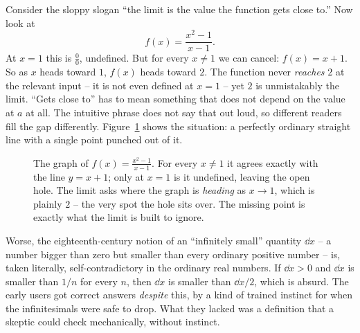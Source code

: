 \begin{intuitionbox}
Consider the sloppy slogan ``the limit is the value the function gets close to.''
Now look at
\[
  f(x) = \frac{x^2 - 1}{x - 1}.
\]
At $x = 1$ this is $\tfrac{0}{0}$, undefined. But for every $x \ne 1$ we can
cancel: $f(x) = x + 1$. So as $x$ heads toward $1$, $f(x)$ heads toward $2$. The
function never \emph{reaches} $2$ at the relevant input -- it is not even
defined at $x=1$ -- yet $2$ is unmistakably the limit. ``Gets close to'' has to
mean something that does not depend on the value at $a$ at all. The intuitive
phrase does not say that out loud, so different readers fill the gap
differently. Figure~\ref{ch06:fig-hole} shows the situation: a perfectly
ordinary straight line with a single point punched out of it.
\end{intuitionbox}

\begin{figure}[H]
\centering
{}
\caption{The graph of $f(x)=\frac{x^2-1}{x-1}$. For every $x\ne1$ it agrees
exactly with the line $y=x+1$; only at $x=1$ is it undefined, leaving the open
hole. The limit asks where the graph is \emph{heading} as $x\to1$, which is
plainly $2$ -- the very spot the hole sits over. The missing point is exactly
what the limit is built to ignore.}
\label{ch06:fig-hole}
\end{figure}

Worse, the eighteenth-century notion of an ``infinitely small'' quantity $\dd x$
-- a number bigger than zero but smaller than every ordinary positive number --
is, taken literally, self-contradictory in the ordinary real numbers. If
$\dd x > 0$ and $\dd x$ is smaller than $1/n$ for every $n$, then $\dd x$ is
smaller than $\dd x / 2$, which is absurd. The early users got correct answers
\emph{despite} this, by a kind of trained instinct for when the infinitesimals
were safe to drop. What they lacked was a definition that a skeptic could check
mechanically, without instinct.

